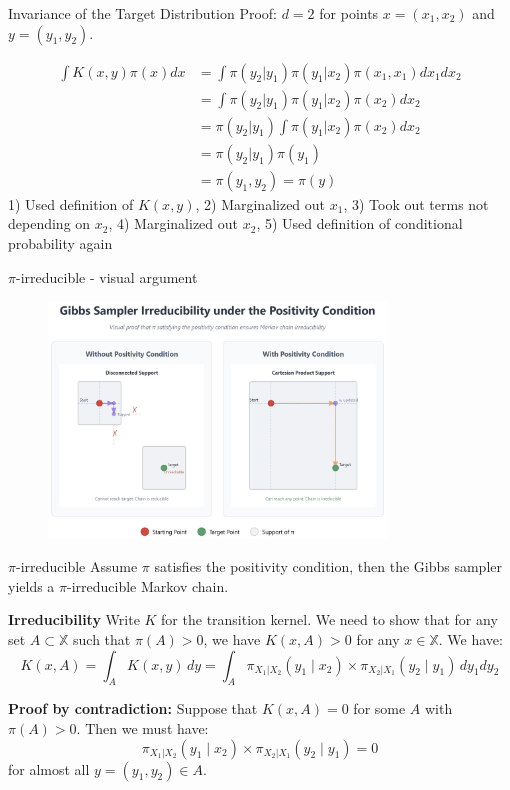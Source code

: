 \begin{frame}{Invariance of the Target Distribution }
	Proof: $d=2$ for points $x=(x_1,x_2)$ and $y=(y_1,y_2)$.

	\begin{align}
		\int K(x,y) \pi(x)dx & = \int \pi(y_2 | y_1)\pi(y_1 | x_2)\pi(x_1, x_1)dx_1 dx_2 \\
		                     & = \int \pi(y_2 | y_1)\pi(y_1 | x_2)\pi(x_2)dx_2           \\
		                     & = \pi(y_2 | y_1) \int \pi(y_1 | x_2)\pi(x_2)dx_2          \\
		                     & = \pi(y_2 | y_1)\pi(y_1)                                  \\
		                     & = \pi(y_1, y_2) = \pi(y)
	\end{align}
	1) Used definition of $K(x,y)$, 2) Marginalized out $x_1$,
	3) Took out terms not depending on $x_2$, 4) Marginalized out $x_2$,
	5) Used definition of conditional probability again
\end{frame}

\begin{frame}{$\pi$-irreducible - visual argument}
	\begin{figure}
		\centering
		\includegraphics[width=0.8\textwidth]{positivity_condition.jpg}
		\caption{}
	\end{figure}
\end{frame}


\begin{frame}{$\pi$-irreducible}
	Assume $\pi$ satisfies the positivity condition, then the Gibbs sampler
	yields a $\pi$-irreducible Markov chain.

	\textbf{Irreducibility} Write $K$ for the transition kernel. We need to show that for
	any set $A \subset \mathbb{X}$ such that $\pi(A) > 0$, we have $K(x, A) > 0$ for
	any $x \in \mathbb{X}$. We have:
	\begin{equation*}
		K(x, A) = \int_A K(x, y)\,dy = \int_A \pi_{X_1|X_2}(y_1 \mid x_2) \times \pi_{X_2|X_1}(y_2 \mid y_1)\,dy_1dy_2
	\end{equation*}

	\textbf{Proof by contradiction:} Suppose that $K(x, A) = 0$ for some $A$ with $\pi(A) > 0$.
	Then we must have:
	\begin{equation*}
		\pi_{X_1|X_2}(y_1 \mid x_2) \times \pi_{X_2|X_1}(y_2 \mid y_1) = 0
	\end{equation*}
	for almost all $y = (y_1, y_2) \in A$.
\end{frame}

